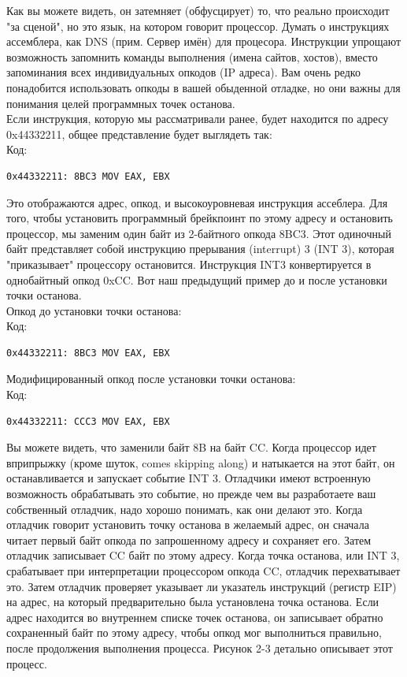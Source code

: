 \documentclass[12pt, a4paper, oneside]{book}
\begin{document}
Как вы можете видеть, он затемняет (обфусцирует) то, что реально происходит "за сценой", но это язык, на котором говорит процессор. Думать о инструкциях ассемблера, как DNS (прим. Сервер имён) для процесора. Инструкции упрощают возможность запомнить команды выполнения (имена сайтов, хостов), вместо запоминания всех индивидуальных опкодов (IP адреса). Вам очень редко понадобится использовать опкоды в вашей обыденной отладке, но они важны для понимания целей программных точек останова.\\

Если инструкция, которую мы рассматривали ранее, будет находится по адресу 0x44332211, общее представление будет выглядеть так:\\
Код:
\begin{verbatim}
0x44332211: 8BC3 MOV EAX, EBX
\end{verbatim}
Это отображаются адрес, опкод, и высокоуровневая инструкция ассеблера. Для того, чтобы установить программный брейкпоинт по этому адресу и остановить процессор, мы заменим один байт из 2-байтного опкода 8BC3. Этот одиночный байт представляет собой инструкцию прерывания (interrupt) 3 (INT 3), которая "приказывает" процессору остановится. Инструкция INT3 конвертируется в однобайтный опкод 0xCC. Вот наш предыдущий пример до и после установки точки останова.\\

Опкод до установки точки останова:\\
Код:
\begin{verbatim}
0x44332211: 8BC3 MOV EAX, EBX
\end{verbatim}
Модифицированный опкод после установки точки останова:\\
Код:
\begin{verbatim}
0x44332211: CCC3 MOV EAX, EBX
\end{verbatim}
Вы можете видеть, что заменили байт 8B на байт CC. Когда процессор идет вприпрыжку (кроме шуток, comes skipping along) и натыкается на этот байт, он останавливается и запускает событие INT 3. Отладчики имеют встроенную возможность обрабатывать это событие, но прежде чем вы разработаете ваш собственный отладчик, надо хорошо понимать, как они делают это. Когда отладчик говорит установить точку останова в желаемый адрес, он сначала читает первый байт опкода по запрошенному адресу и сохраняет его. Затем отладчик записывает CC байт по этому адресу. Когда точка останова, или INT 3, срабатывает при интерпретации процессором опкода CC, отладчик перехватывает это. Затем отладчик проверяет указывает ли указатель инструкций (регистр EIP) на адрес, на который предварительно была установлена точка останова. Если адрес находится во внутреннем списке точек останова, он записывает обратно сохраненный байт по этому адресу, чтобы опкод мог выполниться правильно, после продолжения выполнения процесса. Рисунок 2-3 детально описывает этот процесс.\\
\end{document}
